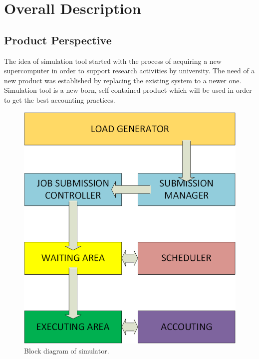 
\chapter{Overall Description} \label{chp:overall-description}

\section{Product Perspective}

	The idea of simulation tool started with the process of acquiring a new supercomputer in order to support research activities by university. The need of a new product was established by replacing the existing system to a newer one. Simulation tool is a new-born, self-contained product which will be used in order to get the best accounting practices. 	
	\begin{figure} 
		\centering
		\includegraphics[scale=0.4]{../visio-files/components}
		\caption{Block diagram of simulator.}
		\label{fig:block-diagram-of-simulator}
	\end{figure}

